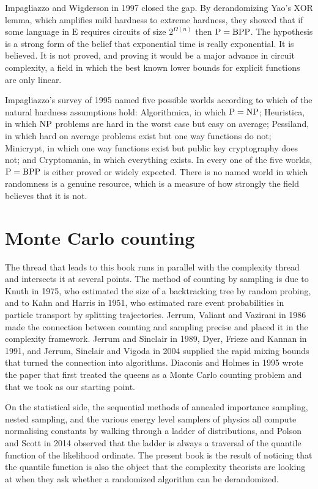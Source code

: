 Impagliazzo and Wigderson in 1997 closed the gap. By derandomizing Yao's XOR lemma, which amplifies mild hardness to extreme hardness, they showed that if some language in $\mathrm{E}$ requires circuits of size $2^{\Omega(n)}$ then $\mathrm{P} = \mathrm{BPP}$. The hypothesis is a strong form of the belief that exponential time is really exponential. It is believed. It is not proved, and proving it would be a major advance in circuit complexity, a field in which the best known lower bounds for explicit functions are only linear.

Impagliazzo's survey of 1995 named five possible worlds according to which of the natural hardness assumptions hold: Algorithmica, in which $\mathrm{P} = \mathrm{NP}$; Heuristica, in which $\mathrm{NP}$ problems are hard in the worst case but easy on average; Pessiland, in which hard on average problems exist but one way functions do not; Minicrypt, in which one way functions exist but public key cryptography does not; and Cryptomania, in which everything exists. In every one of the five worlds, $\mathrm{P} = \mathrm{BPP}$ is either proved or widely expected. There is no named world in which randomness is a genuine resource, which is a measure of how strongly the field believes that it is not.

\section{Monte Carlo counting}

The thread that leads to this book runs in parallel with the complexity thread and intersects it at several points. The method of counting by sampling is due to Knuth in 1975, who estimated the size of a backtracking tree by random probing, and to Kahn and Harris in 1951, who estimated rare event probabilities in particle transport by splitting trajectories. Jerrum, Valiant and Vazirani in 1986 made the connection between counting and sampling precise and placed it in the complexity framework. Jerrum and Sinclair in 1989, Dyer, Frieze and Kannan in 1991, and Jerrum, Sinclair and Vigoda in 2004 supplied the rapid mixing bounds that turned the connection into algorithms. Diaconis and Holmes in 1995 wrote the paper that first treated the queens as a Monte Carlo counting problem and that we took as our starting point.

On the statistical side, the sequential methods of annealed importance sampling, nested sampling, and the various energy level samplers of physics all compute normalising constants by walking through a ladder of distributions, and Polson and Scott in 2014 observed that the ladder is always a traversal of the quantile function of the likelihood ordinate. The present book is the result of noticing that the quantile function is also the object that the complexity theorists are looking at when they ask whether a randomized algorithm can be derandomized.
